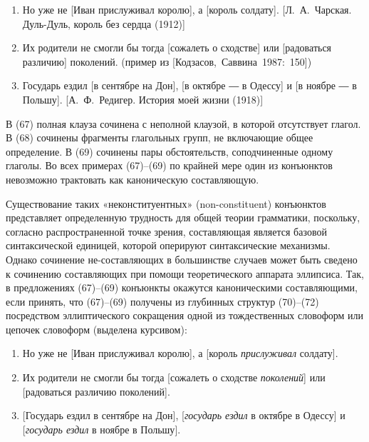 \begin{enumerate}
  \def\labelenumi{(\arabic{enumi})}
  \setcounter{enumi}{66}
  \item
        Но уже не {[}Иван прислуживал королю{]}, а {[}король солдату{]}.
        {[}Л.~А.~Чарская. Дуль-Дуль, король без сердца (1912){]}
  \item
        Их родители не смогли бы тогда {[}сожалеть о сходстве{]} или
        {[}радоваться различию{]} поколений. (пример из
        {[}Кодзасов,~Саввина~1987:~150{]})
  \item
        Государь ездил {[}в сентябре на Дон{]}, {[}в октябре ― в Одессу{]} и
        {[}в ноябре ― в Польшу{]}. {[}А.~Ф.~Редигер. История моей жизни
        (1918){]}
\end{enumerate}

В (67) полная клауза сочинена с неполной клаузой, в которой отсутствует
глагол. В (68) сочинены фрагменты глагольных групп, не включающие общее
определение. В (69) сочинены пары обстоятельств, соподчиненные одному
глаголы. Во всех примерах (67)--(69) по крайней мере один из конъюнктов
невозможно трактовать как каноническую составляющую.

Существование таких «неконституентных» (non-constituent) конъюнктов
представляет определенную трудность для общей теории грамматики,
поскольку, согласно распространенной точке зрения, составляющая является
базовой синтаксической единицей, которой оперируют синтаксические
механизмы. Однако сочинение не-составляющих в большинстве случаев может
быть сведено к сочинению составляющих при помощи теоретического аппарата
эллипсиса. Так, в предложениях (67)--(69) конъюнкты окажутся
каноническими составляющими, если принять, что (67)--(69) получены из
глубинных структур (70)--(72) посредством эллиптического сокращения
одной из тождественных словоформ или цепочек словоформ (выделена
курсивом):

\begin{enumerate}
  \def\labelenumi{(\arabic{enumi})}
  \setcounter{enumi}{69}
  \item
        Но уже не {[}Иван прислуживал королю{]}, а {[}король
        \textit{прислуживал} солдату{]}.
  \item
        Их родители не смогли бы тогда {[}сожалеть о сходстве
        \textit{поколений}{]} или {[}радоваться различию поколений{]}.
  \item
        {[}Государь ездил в сентябре на Дон{]}, {[}\textit{государь ездил} в
        октябре в Одессу{]} и {[}\textit{государь ездил} в ноябре в Польшу{]}.
\end{enumerate}

